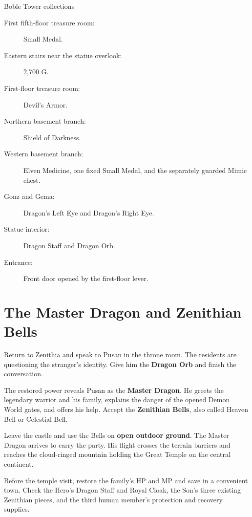 \begin{routecheck}{Boble Tower collections}
\begin{description}
  \item[First fifth-floor treasure room:] Small Medal.
  \item[Eastern stairs near the statue overlook:] 2,700 G.
  \item[First-floor treasure room:] Devil's Armor.
  \item[Northern basement branch:] Shield of Darkness.
  \item[Western basement branch:] Elven Medicine, one fixed
    Small Medal, and the separately guarded Mimic chest.
  \item[Gonz and Gema:] Dragon's Left Eye and Dragon's Right Eye.
  \item[Statue interior:] Dragon Staff and Dragon Orb.
  \item[Entrance:] Front door opened by the first-floor lever.
\end{description}
\end{routecheck}

\section{The Master Dragon and Zenithian Bells}

Return to Zenithia and speak to Pusan in the throne room.
The residents are questioning the stranger's identity.
Give him the \textbf{Dragon Orb} and finish the conversation.

The restored power reveals Pusan as the \textbf{Master Dragon}.
He greets the legendary warrior and his family, explains the
danger of the opened Demon World gates, and offers his help.
Accept the \textbf{Zenithian Bells}, also called Heaven Bell
or Celestial Bell.


Leave the castle and use the Bells on \textbf{open outdoor ground}.
The Master Dragon arrives to carry the party. His flight crosses
the terrain barriers and reaches the cloud-ringed mountain
holding the Great Temple on the central continent.

Before the temple visit, restore the family's HP and MP and
save in a convenient town. Check the Hero's Dragon Staff and
Royal Cloak, the Son's three existing Zenithian pieces, and
the third human member's protection and recovery supplies.

